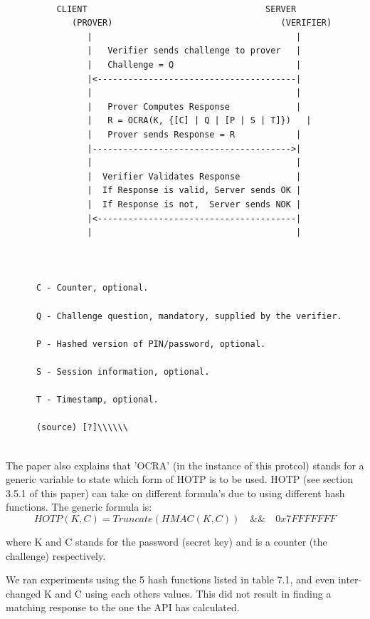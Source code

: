 \documentclass[bsc,frontabs,twoside,singlespacing,parskip,deptreport]{infthesis}     %
\begin{document}
\pagebreak
\begin{Verbatim}[commandchars=\\\{\}, fontsize=\small]

	      CLIENT                                   SERVER
             (PROVER)                                 (VERIFIER)
                |                                        |
                |   Verifier sends challenge to prover   |
                |   Challenge = Q                        |
                |<---------------------------------------|
                |                                        |
                |   Prover Computes Response             |
                |   R = OCRA(K, {[C] | Q | [P | S | T]})   |
                |   Prover sends Response = R            |
                |--------------------------------------->|
                |                                        |
                |  Verifier Validates Response           |
                |  If Response is valid, Server sends OK |
                |  If Response is not,  Server sends NOK |
                |<---------------------------------------|
                |                                        |



      C - Counter, optional.

      Q - Challenge question, mandatory, supplied by the verifier.

      P - Hashed version of PIN/password, optional.

      S - Session information, optional.

      T - Timestamp, optional.
      
      (source) [?]\\\\\\
            
\end{Verbatim}


The paper also explains that 'OCRA' (in the instance of this protcol) stands for a generic variable to state which form of HOTP is to be used. HOTP (see section 3.5.1 of this paper) can take on different formula's due to using different hash functions. The generic formula is:\\
$$HOTP(K,C) = Truncate(HMAC(K,C)) \quad \&\& \quad 0x7FFFFFFF$$

where K and C stands for the password (secret key) and is a counter (the challenge) respectively.

We ran experiments using the 5 hash functions listed in table 7.1, and even inter-changed K and C using each others values. This did not result in finding a matching response to the one the API has calculated.\\
\end{document}
